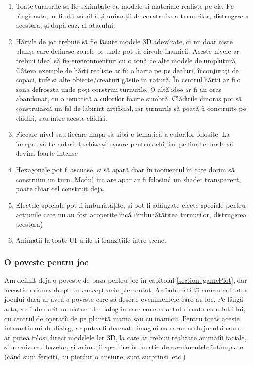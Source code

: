 \documentclass[12pt, a4paper]{article}
\begin{document}
	\begin{enumerate}
		\item Toate turnurile să fie schimbate cu modele și materiale realiste pe ele. Pe lângă asta, ar fi util să aibă și animații de construire a turnurilor, distrugere a acestora, și după caz, al atacului.
		\item Hărțile de joc trebuie să fie făcute modele 3D adevărate, ci nu doar niște planșe care definesc zonele pe unde pot să circule inamicii. Aceste nivele ar trebuii ideal să fie environmenturi cu o tonă de alte modele de umplutură. Câteva exemple de hărți realiste ar fi: o harta pe pe dealuri, înconjurați de copaci, tufe și alte obiecte/creaturi găsite în natură. În centrul hărțîi ar fi o zona defrosata unde poți construii turnurile. O altă idee ar fi un oraș abandonat, cu o tematică a culorilor foarte sumbră. Clădirile dinoras pot să construiască un fel de labirint artificial, iar turnurile să poată fi construite pe clădiri, sau între aceste clădiri.
		\item Fiecare nivel sau fiecare mapa să aibă o tematică a culorilor folosite. La început să fie culori deschise și ușoare pentru ochi, iar pe final culorile să devină foarte intense
		\item Hexagonale pot fi ascunse, și să apară doar în momentul în care dorim să construim un turn. Modul inc are apar ar fi folosind un shader transparent, poate chiar cel construit deja.
		\item Efectele speciale pot fi îmbunătățite, și pot fi adăugate efecte speciale pentru acțiunile care nu au fost acoperite încă (îmbunătățirea turnurilor, distrugerea acestora)
		\item Animații la toate UI-urile și tranzițiile între scene.
	\end{enumerate}
	
	
	
	
	
	\subsubsection{O poveste pentru joc}
	
	Am definit deja o poveste de baza pentru joc în capitolul \ref{section: gamePlot}, dar această a rămas drept un concept neimplementat. Ar îmbunătățîi enorm calitatea jocului dacă ar avea o poveste care să descrie evenimentele care au loc. Pe lângă asta, ar fi de dorit un sistem de dialog în care comandantul discuta cu solatii lui, cu centrul de operațîi de pe planetă mama sau cu inamicii. Pentru toate aceste interactiunni de dialog, ar putea fi desenate imagini cu caracterele jocului sau s-ar putea folosi direct modelele lor 3D, la care ar trebuii realizate animațîi faciale, sincronizarea buzelor, și animații specifice în funcție de evenimentele întâmplate (când sunt fericiți, au pierdut o misiune, sunt surprinși, etc.)
	
\end{document}
